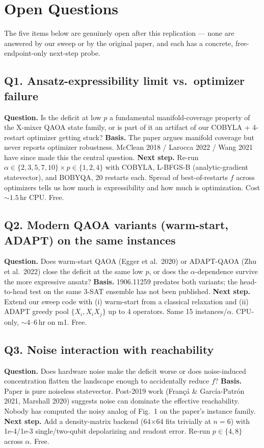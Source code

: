 \section{Open Questions}

The five items below are genuinely open after this replication ---
none are answered by our sweep or by the original paper, and each has
a concrete, free-endpoint-only next-step probe.

\subsection*{Q1. Ansatz-expressibility limit vs.\ optimizer failure}
\textbf{Question.} Is the deficit at low \(p\) a fundamental
manifold-coverage property of the X-mixer QAOA state family, or is
part of it an artifact of our COBYLA + 4-restart optimizer getting
stuck?
\textbf{Basis.} The paper argues manifold coverage but never reports
optimizer robustness. McClean 2018 / Larocca 2022 / Wang 2021 have
since made this the central question.
\textbf{Next step.} Re-run \(\alpha\in\{2,3,5,7,10\}\times p\in\{1,2,4\}\)
with COBYLA, L-BFGS-B (analytic-gradient statevector), and BOBYQA,
20 restarts each. Spread of best-of-restarts \(f\) across optimizers
tells us how much is expressibility and how much is optimization.
Cost \(\sim 1.5\)\,hr CPU. Free.

\subsection*{Q2. Modern QAOA variants (warm-start, ADAPT) on the same instances}
\textbf{Question.} Does warm-start QAOA (Egger et al.\ 2020) or
ADAPT-QAOA (Zhu et al.\ 2022) close the deficit at the same low \(p\),
or does the \(\alpha\)-dependence survive the more expressive ansatz?
\textbf{Basis.} 1906.11259 predates both variants; the head-to-head
test on the same 3-SAT ensemble has not been published.
\textbf{Next step.} Extend our sweep code with (i) warm-start from a
classical relaxation and (ii) ADAPT greedy pool
\(\{X_i,X_iX_j\}\) up to 4 operators. Same 15 instances/\(\alpha\).
CPU-only, \(\sim 4\)--6\,hr on m1. Free.

\subsection*{Q3. Noise interaction with reachability}
\textbf{Question.} Does hardware noise make the deficit worse or does
noise-induced concentration flatten the landscape enough to
accidentally reduce \(f\)?
\textbf{Basis.} Paper is pure noiseless statevector. Post-2019 work
(Franç\'a \& Garc\'ia-Patr\'on 2021, Marshall 2020) suggests noise can
dominate the effective reachability. Nobody has computed the noisy
analog of Fig.~1 on the paper's instance family.
\textbf{Next step.} Add a density-matrix backend
(64\(\times\)64 fits trivially at \(n=6\)) with 1e-4/1e-3 single/two-qubit
depolarizing and readout error. Re-run \(p\in\{4,8\}\) across \(\alpha\).
Free.

